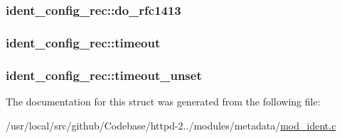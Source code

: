 \subsubsection[{\texorpdfstring{do\+\_\+rfc1413}{do_rfc1413}}]{ ident\+\_\+config\+\_\+rec\+::do\+\_\+rfc1413}\hypertarget{structident__config__rec_a75afac676f44f7025b662dbabeeb0623}{}\label{structident__config__rec_a75afac676f44f7025b662dbabeeb0623}
\subsubsection[{\texorpdfstring{timeout}{timeout}}]{ ident\+\_\+config\+\_\+rec\+::timeout}\hypertarget{structident__config__rec_af6ba26eb2b2b341d00b06f447b8eb6fa}{}\label{structident__config__rec_af6ba26eb2b2b341d00b06f447b8eb6fa}
\subsubsection[{\texorpdfstring{timeout\+\_\+unset}{timeout_unset}}]{ ident\+\_\+config\+\_\+rec\+::timeout\+\_\+unset}\hypertarget{structident__config__rec_acadc2a62f1ab6952ae388fd336c66053}{}\label{structident__config__rec_acadc2a62f1ab6952ae388fd336c66053}


The documentation for this struct was generated from the following file\+:\begin{DoxyCompactItemize}
\item 
/usr/local/src/github/\+Codebase/httpd-\/2../modules/metadata/\hyperlink{mod__ident_8c}{mod\+\_\+ident.\+c}\end{DoxyCompactItemize}
